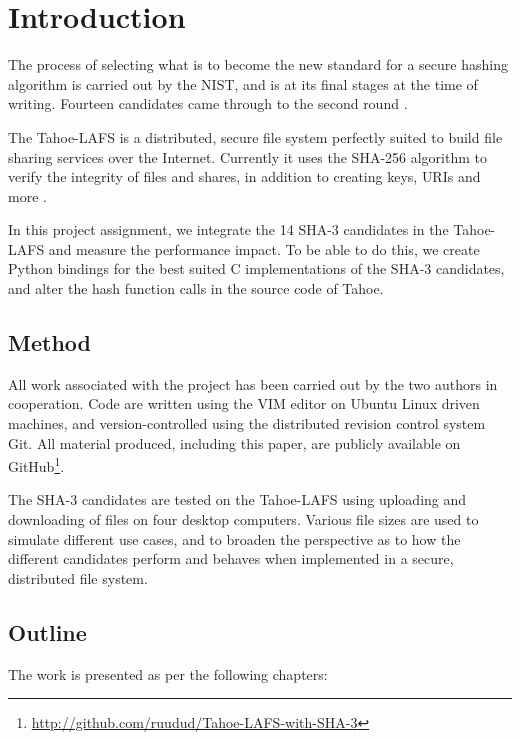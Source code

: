 \documentclass[english,12pt,a4paper]{book}
\begin{document}
\chapter{Introduction}
\setcounter{page}{1}

The process of selecting what is to become the new standard for a secure hashing
algorithm is carried out by the {NIST}, and is at its final stages at the time
of writing. Fourteen candidates came through to the second round
\cite{s_nistround2}.

The Tahoe-\ac{LAFS} is a distributed, secure file system perfectly suited to
build file sharing services over the Internet. Currently it uses the
\ac{SHA}-256 algorithm to verify the integrity of files and shares, in addition
to creating keys, \acp{URI} and more \cite{t_tahoe}.

In this project assignment, we integrate the 14 \ac{SHA}-3 candidates in
the Tahoe-\ac{LAFS} and measure the performance impact. To be able to do this,
we create Python bindings for the best suited C implementations of the SHA-3
candidates, and alter the hash function calls in the source code of Tahoe.

\section{Method}

All work associated with the project has been carried out by the two authors in
cooperation. Code are written using the VIM editor on Ubuntu Linux
driven machines, and version-controlled using the distributed revision control
system Git. All material produced, including this paper, are publicly available
on GitHub\footnote{\url{http://github.com/ruudud/Tahoe-LAFS-with-SHA-3}}.

The \ac{SHA}-3 candidates are tested on the Tahoe-\ac{LAFS} using uploading and
downloading of files on four desktop computers. Various file sizes are used to
simulate different use cases, and to broaden the perspective as to how the
different candidates perform and behaves when implemented in a secure,
distributed file system.

\section{Outline}

The work is presented as per the following chapters:
\end{document}
